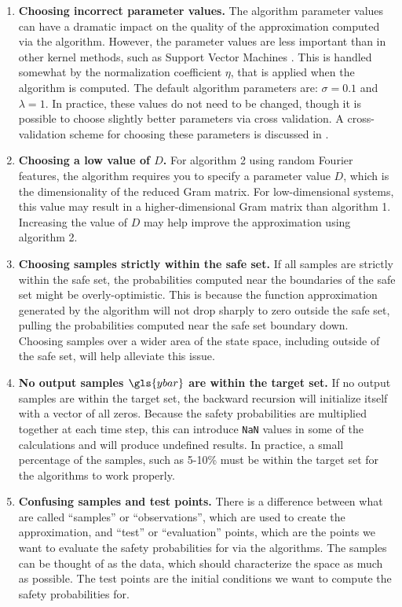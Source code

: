 \documentclass[11pt]{article}
\begin{document}
\begin{enumerate}
  \item
  \textbf{Choosing incorrect parameter values.} The algorithm parameter values
  can have a dramatic impact on the quality of the approximation computed via
  the algorithm. However, the parameter values are less important than in other
  kernel methods, such as Support Vector Machines \cite{drucker1997support}. This is handled
  somewhat by the normalization coefficient $\eta$, that is applied when the
  algorithm is computed. The default algorithm parameters are: $\sigma = 0.1$
  and $\lambda = 1$. In practice, these values do not need to be changed, though
  it is possible to choose slightly better parameters via cross validation. A
  cross-validation scheme for choosing these parameters is discussed in
  \cite{micchelli2005learning}.

  \item
  \textbf{Choosing a low value of $D$.} For algorithm 2 using random Fourier features, the algorithm requires you to specify a parameter value $D$, which is the dimensionality of the reduced Gram matrix. For low-dimensional systems, this value may result in a higher-dimensional Gram matrix than algorithm 1. Increasing the value of $D$ may help improve the approximation using algorithm 2.

  \item
  \textbf{Choosing samples strictly within the safe set.} If all samples are
  strictly within the safe set, the probabilities computed near the boundaries
  of the safe set might be overly-optimistic. This is because the function
  approximation generated by the algorithm will not drop sharply to zero outside
  the safe set, pulling the probabilities computed near the safe set boundary
  down. Choosing samples over a wider area of the state space, including outside
  of the safe set, will help alleviate this issue.

  \item
  \textbf{No output samples $\gls{ybar}$ are within the target set.} If no
  output samples are within the target set, the backward recursion will
  initialize itself with a vector of all zeros. Because the safety probabilities
  are multiplied together at each time step, this can introduce \verb|NaN|
  values in some of the calculations and will produce undefined results. In
  practice, a small percentage of the samples, such as 5-10\% must be within the
  target set for the algorithms to work properly.

  \item
  \textbf{Confusing samples and test points.} There is a difference between what are called ``samples'' or ``observations'', which are used to create the approximation, and ``test'' or ``evaluation'' points, which are the points we want to evaluate the safety probabilities for via the algorithms. The samples can be thought of as the data, which should characterize the space as much as possible. The test points are the initial conditions we want to compute the safety probabilities for.
\end{enumerate}
\end{document}

